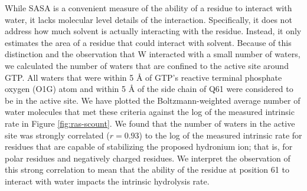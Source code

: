 While SASA is a convenient measure of the ability of a residue to interact with water, it lacks molecular level details of the interaction. 
Specifically, it does not address how much solvent is actually interacting with the residue. 
Instead, it only estimates the area of a residue that could interact with solvent. 
Because of this distinction and the observation that W interacted with a small number of waters, we calculated the number of waters that are confined to the active site around GTP. 
All waters that were within 5 \si{\angstrom} of GTP's reactive terminal phosphate oxygen (O1G) atom and within 5 \si{\angstrom} of the side chain of Q61 were considered to be in the active site. 
We have plotted the Boltzmann-weighted average number of water molecules that met these criteria against the log of the measured intrinsic rate in Figure \ref{fig:ras-scount}. 
We found that the number of waters in the active site was strongly correlated ($r = 0.93$) to the log of the measured intrinsic rate for residues that are capable of stabilizing the proposed hydronium ion; that is, for polar residues and negatively charged residues. 
We interpret the observation of this strong correlation to mean that the ability of the residue at position 61 to interact with water impacts the intrinsic hydrolysis rate.

